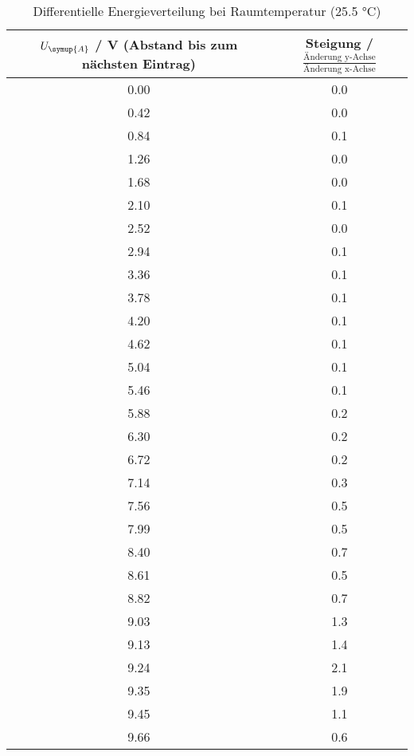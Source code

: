 \begin{table}[!htp]
\centering
\caption{Differentielle Energieverteilung bei Raumtemperatur (25.5 °C)}
\label{tab:messreihe1}
\begin{tabular} {c c}
\toprule
 {{$U_{\symup{A}}$ / V (Abstand bis zum nächsten Eintrag)}} & {{Steigung  / $\frac{\text{Änderung y-Achse}}{\text{Änderung x-Achse}}$}}  \\
\midrule
0.00 & 0.0   \\
0.42 & 0.0   \\
0.84 & 0.1 \\
1.26 & 0.0   \\
1.68 & 0.0   \\
2.10 & 0.1 \\
2.52 & 0.0   \\
2.94 & 0.1 \\
3.36 & 0.1 \\
3.78 & 0.1 \\
4.20 & 0.1 \\
4.62 & 0.1 \\
5.04 & 0.1 \\
5.46 & 0.1 \\
5.88 & 0.2 \\
6.30 & 0.2 \\
6.72 & 0.2 \\
7.14 & 0.3 \\
7.56 & 0.5 \\
7.99 & 0.5 \\
8.40 & 0.7 \\
8.61 & 0.5 \\
8.82 & 0.7 \\
9.03 & 1.3 \\
9.13 & 1.4 \\
9.24 & 2.1 \\
9.35 & 1.9 \\
9.45 & 1.1 \\
9.66 & 0.6 \\
\bottomrule 
\end{tabular}
\end{table}